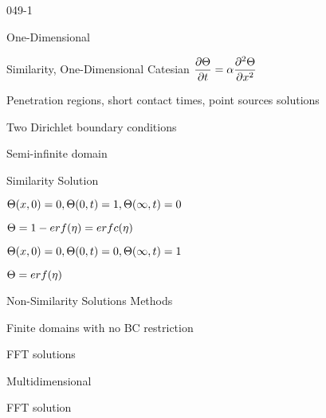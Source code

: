 \begin{mitframe}{049-1}
\begin{listone}
	\item One-Dimensional
    	\begin{listtwo}
        	\item Similarity, One-Dimensional Catesian $\dfrac{\partial\dimltemp}{\partial{t}}=\tdiff\dfrac{\partial^2\dimltemp}{\partial\disp^2}$
            	\begin{listthree}
                	\item Penetration regions, short contact times, point sources solutions
                    \item Two Dirichlet boundary conditions
                    	\begin{listfour}
                        	\item Semi-infinite domain
                        \end{listfour}
                	\item Similarity Solution
                    	\begin{listfour}
                        	\item $\dimltemp(\disp,0)=0, \dimltemp(0,t)=1, \dimltemp(\infty,t)=0$
                            \begin{listfive}
                           		\item $\dimltemp=1-\e\pos\fug(\intrinsvisc)=\e\pos\fug{c}(\intrinsvisc)$
                                
                            \end{listfive}
                            \item $\dimltemp(\disp,0)=0, \dimltemp(0,t)=0, \dimltemp(\infty,{t})=1$
                            	\begin{listfive}
                                	\item $\dimltemp=\e\pos\fug(\intrinsvisc)$
                                    
                                \end{listfive}
                        \end{listfour}
                \end{listthree}
       	\item Non-Similarity Solutions Methods
        \begin{listthree}
        	\item Finite domains with no BC restriction
            \begin{listthree}
            	\item FFT solutions
            \end{listthree}
           \end{listthree}
       \end{listtwo}
\item Multidimensional
	\begin{listtwo}
    		\item FFT solution
    \end{listtwo}
\end{listone}
\end{mitframe}